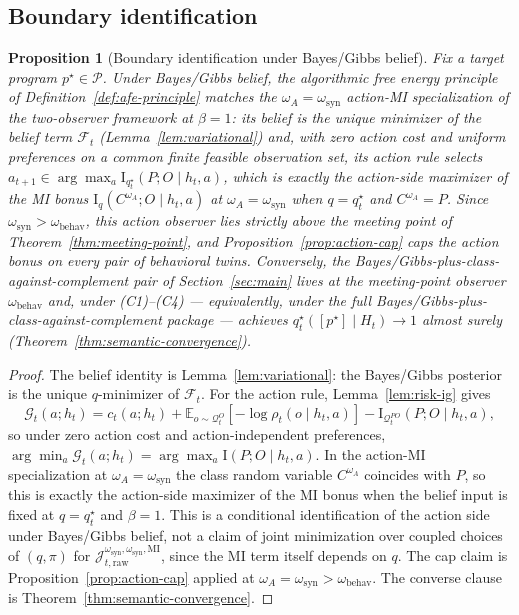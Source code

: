 \documentclass[11pt]{article}
\newtheorem{proposition}[theorem]{Proposition}
\theoremstyle{definition}
\theoremstyle{remark}
\newcommand{\Pcal}{\mathcal{P}}
\newcommand{\Fcal}{\mathcal{F}}
\newcommand{\Gcal}{\mathcal{G}}
\newcommand{\Qcal}{\mathcal{Q}}
\newcommand{\E}{\mathbb{E}}
\newcommand{\I}{\mathrm{I}}
\begin{document}
\subsection{Boundary identification}
\label{sec:boundary-identification}

\begin{proposition}[Boundary identification under Bayes/Gibbs belief]
\label{prop:boundary-identity}
Fix a target program $p^\star\in\Pcal$. 
Under Bayes/Gibbs belief, the algorithmic free energy principle of Definition~\ref{def:afe-principle} matches the $\omega_A=\omega_{\mathrm{syn}}$ action-MI specialization of the two-observer framework at $\beta=1$: its belief is the unique minimizer of the belief term $\Fcal_t$ (Lemma~\ref{lem:variational}) and, with zero action cost and uniform preferences on a common finite feasible observation set, its action rule selects $a_{t+1}\in\arg\max_a \I_{q_t^\star}(P;O\mid h_t,a)$, which is exactly the action-side maximizer of the MI bonus $\I_q(C^{\omega_A};O\mid h_t,a)$ at $\omega_A=\omega_{\mathrm{syn}}$ when $q=q_t^\star$ and $C^{\omega_A}=P$. Since $\omega_{\mathrm{syn}}>\omega_{\mathrm{behav}}$, this action observer lies strictly above the meeting point of Theorem~\ref{thm:meeting-point}, and Proposition~\ref{prop:action-cap} caps the action bonus on every pair of behavioral twins. Conversely, the Bayes/Gibbs-plus-class-against-complement pair of Section~\ref{sec:main} lives at the meeting-point observer $\omega_{\mathrm{behav}}$ and, under \textup{(C1)--(C4)} --- equivalently, under the full Bayes/Gibbs-plus-class-against-complement package --- achieves $q_t^\star([p^\star]\mid H_t)\to 1$ almost surely (Theorem~\ref{thm:semantic-convergence}).
\end{proposition}

\begin{proof}
The belief identity is Lemma~\ref{lem:variational}: the Bayes/Gibbs posterior is the unique $q$-minimizer of $\Fcal_t$. For the action rule, Lemma~\ref{lem:risk-ig} gives
\[
\Gcal_t(a;h_t)
=
c_t(a;h_t)+\E_{o\sim\Qcal_t^O}[-\log\rho_t(o\mid h_t,a)]-\I_{\Qcal_t^{PO}}(P;O\mid h_t,a),
\]
so under zero action cost and action-independent preferences, $\arg\min_a\Gcal_t(a;h_t)=\arg\max_a\I(P;O\mid h_t,a)$. In the action-MI specialization at $\omega_A=\omega_{\mathrm{syn}}$ the class random variable $C^{\omega_A}$ coincides with $P$, so this is exactly the action-side maximizer of the MI bonus when the belief input is fixed at $q=q_t^\star$ and $\beta=1$. This is a conditional identification of the action side under Bayes/Gibbs belief, not a claim of joint minimization over coupled choices of $(q,\pi)$ for $\mathcal J_{t,\mathrm{raw}}^{\omega_{\mathrm{syn}},\omega_{\mathrm{syn}},\mathrm{MI}}$, since the MI term itself depends on $q$. The cap claim is Proposition~\ref{prop:action-cap} applied at $\omega_A=\omega_{\mathrm{syn}}>\omega_{\mathrm{behav}}$. The converse clause is Theorem~\ref{thm:semantic-convergence}.
\end{proof}
\end{document}
